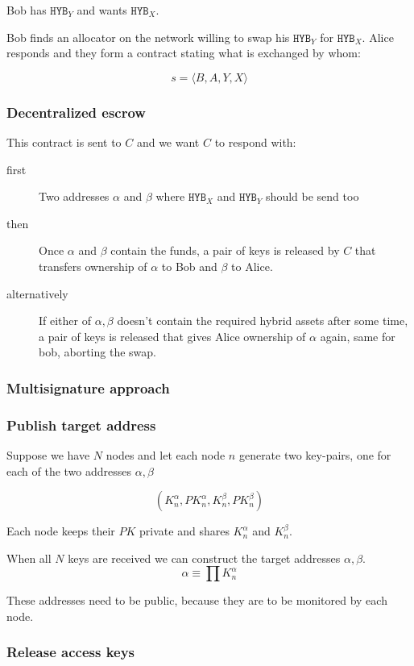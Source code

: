 \documentclass[a4paper,fullpack]{article}
\newcommand{\hyb}[1]{\ensuremath{\mathtt{ HYB }_{#1}}}
\begin{document}
Bob has \hyb{Y} and wants \hyb{X}.

Bob finds an allocator on the network willing to swap his \hyb{Y} for \hyb{X}.
Alice responds and they form a contract stating what is exchanged by whom:

\[
s = \langle B, A, Y, X \rangle
\]

\subsubsection{Decentralized escrow}

This contract is sent to $C$ and we want $C$ to respond with:

\begin{description}
\item[first] Two addresses $\alpha$ and $\beta$ where \hyb{X} and \hyb{Y} should be send too
\item[then] Once $\alpha$ and $\beta$ contain the funds, a pair of keys is released by $C$ that transfers ownership of $\alpha$ to Bob and $\beta$ to Alice.
\item[alternatively] If either of $\alpha,\beta$ doesn't contain the required hybrid assets after some time, a pair of keys is released that gives Alice ownership of $\alpha$ again, same for bob, aborting the swap.
\end{description}

\subsubsection{Multisignature approach}

\subsubsection{Publish target address}

Suppose we have $N$ nodes and let each node $n$ generate two key-pairs,
one for each of the two addresses $\alpha, \beta$

\[
	(K_n^\alpha, PK_n^\alpha, K_n^\beta, PK_n^\beta)
\]

Each node keeps their $PK$ private and shares $K_n^\alpha$ and $K_n^\beta$.

When all $N$ keys are received we can construct the target addresses $\alpha, \beta$.
\[
	\alpha \equiv \prod K_n^\alpha
\]

These addresses need to be public, because they are to be monitored by each node.

\subsubsection{Release access keys}
\end{document}
